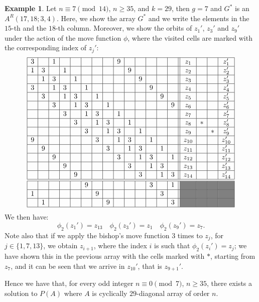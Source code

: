 \documentclass{amsart}
\theoremstyle{definition}
\newtheorem{ex}[prop]{Example}
\numberwithin{equation}{section}
\begin{document}
\begin{ex}
Let $n\equiv 7\pmod {14}$, $n \geq 35$, and $k = 29$, then $g = 7$ and $G^*$ is an $A^{R}(17,18;3,4)$. Here, we show the array $G^*$ and we write the elements in the $15$-th and the $18$-th column. Moreover, we show the orbits of $z_1'$, $z_3'$ and $z_9'$ under the action of the move function $\phi$, where the visited cells are marked with the corresponding index of $z_j'$:
\[
\begin{array}{|c|c|c|c|c|c|c|c|c|c|c|c|c|c||c|c|c|c|} \hline
3&&1&&&&&&9&&&&&&z_1&&&z_1' \\ \hline
1&3&&1&&&&&&9&&&&&z_2&&&z_2' \\ \hline
&1&3&&1&&&&&&9&&&&z_3&&&z_3'\\ \hline
3&&1&3&&1&&&&&&9&&&z_4&&&z_4' \\ \hline
&3&&1&3&&1&&&&&&9&&z_5&&& z_5'\\ \hline
&&3&&1&3&&1&&&&&&9&z_6&&&z_6' \\ \hline
&&&3&&1&3&&1&&&&&&z_7&&&z_7' \\ \hline
&&&&3&&1&3&&1&&&&&z_8&*&&z_8' \\ \hline
&&&&&3&&1&3&&1&&&&z_9&&*&z_9' \\ \hline
9&&&&&&3&&1&3&&1&&&z_{10}&&&z_{10}' \\ \hline
&9&&&&&&3&&1&3&&1&&z_{11}&&&z_{11}' \\ \hline
&&9&&&&&&3&&1&3&&1&z_{12}&&&z_{12}' \\ \hline
&&&9&&&&&&3&&1&3&&z_{13}&&&z_{13}' \\ \hline
&&&&9&&&&&&3&&1&3&z_{14}&&&z_{14}' \\ \hline \hline
&&&&&9&&&&&&3&&1&\cellcolor{gray}&\cellcolor{gray}&\cellcolor{gray}& \cellcolor{gray}\\ \hline
1&&&&&&9&&&&&&3&&\cellcolor{gray}&\cellcolor{gray}&\cellcolor{gray}& \cellcolor{gray}\\ \hline
&1&&&&&&9&&&&&&3&\cellcolor{gray}&\cellcolor{gray}&\cellcolor{gray}& \cellcolor{gray}\\ \hline
\end{array}
\]
We then have:
\[
\phi_2(z_1')=z_{13} \quad \phi_2(z_3')=z_1 \quad \phi_2(z_9')=z_7.
\]
Note also that if we apply  the bishop's move function $3$ times to $z_j$, for $j \in \{1,7,13\}$, we obtain $z_{i+1}$, where the index $i$ is such that $\phi_2(z_i')=z_j$; we have shown this in the previous array with the cells marked with $*$, starting from $z_7$, and it can be seen that we arrive in $z_{10}'$, that is $z_{9+1}'$.

Hence we have that, for every odd integer $n\equiv 0\pmod 7$, $n\geq35$, there exists a solution to $P(A)$ where $A$ is cyclically $29$-diagonal array of order $n$.
\end{ex}
\end{document}
